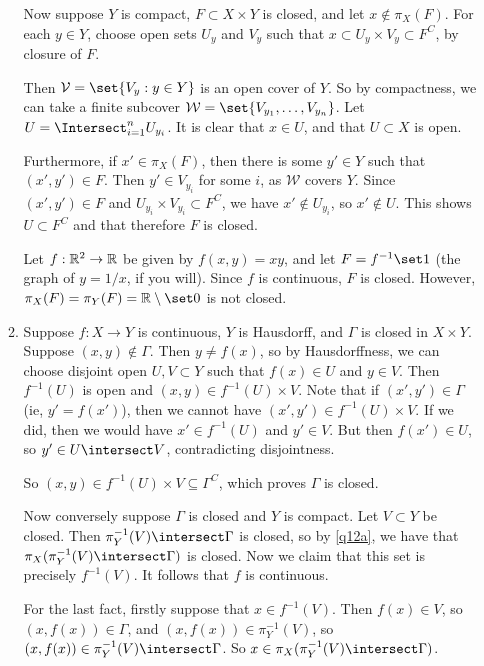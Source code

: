 \documentclass[a4paper,12pt,fleqn]{article}
\begin{document}
\begin{enumerate}[label=\arabic*.,leftmargin=*]
\begin{enumerate}[label=(\alph*)]
    Now suppose \(Y\) is compact, \(F \subset X \times Y\) is closed, and let
    \(x \notin \pi_X(F)\). For each \(y \in Y\), choose open sets \(U_y\) and
    \(V_y\) such that \(x \subset U_y \times V_y \subset F^C\), by closure of
    \(F\).

    Then \(\mathcal V = \set{V_y : y \in Y}\) is an open cover of \(Y\). So by
    compactness, we can take a finite subcover
    \(\mathcal W = \set{V_{y_1}, \dotsc, V_{y_n}}\). Let
    \(U = \Intersect_{i = 1}^n U_{y_i}\). It is clear that \(x \in U\), and that
    \(U \subset X\) is open.

    Furthermore, if \(x' \in \pi_X(F)\), then there is some \(y' \in Y\) such
    that \((x', y') \in F\). Then \(y' \in V_{y_i}\) for some \(i\), as
    \(\mathcal W\) covers \(Y\). Since \((x', y') \in F\) and
    \(U_{y_i} \times V_{y_i} \subset F^C\), we have \(x' \notin U_{y_i}\), so
    \(x' \notin U\). This shows \(U \subset F^C\) and that therefore \(F\) is
    closed.

    Let \(f: \mathbb R^2 \to \mathbb R\) be given by \(f(x, y) = xy\), and let
    \(F = f^{-1}\set 1\) (the graph of \(y = 1/x\), if you will). Since \(f\) is
    continuous, \(F\) is closed. However,
    \(\pi_X(F) = \pi_Y(F) = \R \setminus \set 0\) is not closed.
   \item
    Suppose \(f: X \to Y\) is continuous, \(Y\) is Hausdorff, and \(\Gamma\) is
    closed in \(X \times Y\). Suppose \((x, y) \notin \Gamma\). Then
    \(y \ne f(x)\), so by Hausdorffness, we can choose disjoint open
    \(U, V \subset Y\) such that \(f(x) \in U\) and \(y \in V\). Then
    \(f^{-1}(U)\) is open and \((x, y) \in f^{-1}(U) \times V\). Note that if
    \((x', y') \in \Gamma\) (ie, \(y' = f(x')\)), then we cannot have
    \((x', y') \in f^{-1}(U) \times V\). If we did, then
    we would have \(x' \in f^{-1}(U)\) and \(y' \in V\). But then
    \(f(x') \in U\), so \(y' \in U \intersect V\), contradicting disjointness.

    So \((x, y) \in f^{-1}(U) \times V \subseteq \Gamma^C\), which proves
    \(\Gamma\) is closed.

    Now conversely suppose \(\Gamma\) is closed and \(Y\) is compact. Let
    \(V \subset Y\) be closed. Then \(\pi_Y^{-1}(V) \intersect \Gamma\) is
    closed, so by \ref{q12a}, we have that
    \(\pi_X(\pi_Y^{-1}(V) \intersect \Gamma)\) is closed. Now we claim that this
    set is precisely \(f^{-1}(V)\). It follows that \(f\) is continuous.

    For the last fact, firstly suppose that \(x \in f^{-1}(V)\).
    Then \(f(x) \in V\), so \((x, f(x)) \in \Gamma\), and
    \((x, f(x)) \in \pi_Y^{-1}(V)\), so
    \((x, f(x)) \in \pi_Y^{-1}(V) \intersect \Gamma\). So
    \(x \in \pi_X(\pi_Y^{-1}(V) \intersect \Gamma)\).


\end{enumerate}
\end{enumerate}
\end{document}
